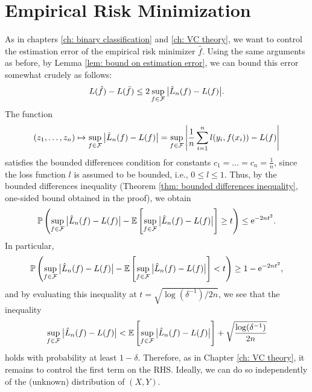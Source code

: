 \section{Empirical Risk Minimization}

As in chapters \ref{ch: binary classification} and \ref{ch: VC theory}, we want to control the estimation error of the empirical risk minimizer $\hat f$. Using the same arguments as before, by Lemma \ref{lem: bound on estimation error}, we can bound this error somewhat crudely as follows:
\[
    L(\hat f) - L(\bar f) \leq 2 \sup_{f \in \mathcal{F}} \big\lvert\hat L_n(f) - L(f)\big\rvert.
\]
The function
\[
    (z_1, \dots, z_n) \mapsto \sup_{f \in \mathcal{F}} \big\lvert\hat L_n(f) - L(f)\big\rvert = \sup_{f \in \mathcal{F}} \abs{ \frac{1}{n} \sum_{i=1}^n l(y_i, f(x_i)) - L(f) }
\]
satisfies the bounded differences condition for constants $c_1 = \dots = c_n = \frac{1}{n}$, since the loss function $l$ is assumed to be bounded, i.e., $0 \leq l \leq 1$. Thus, by the bounded differences inequality (Theorem \ref{thm: bounded differences inequality}, one-sided bound obtained in the proof), we obtain
\[
    \mathbb{P}\left( \sup_{f \in \mathcal{F}} \big\lvert\hat L_n(f) - L(f)\big\rvert - \mathbb{E}\left[ \sup_{f \in \mathcal{F}} \big\lvert\hat L_n(f) - L(f)\big\rvert \right] \geq t \right) \leq \mathrm{e}^{-2nt^2}.
\]
In particular,
\[
    \mathbb{P}\left( \sup_{f \in \mathcal{F}} \big\lvert\hat L_n(f) - L(f)\big\rvert - \mathbb{E}\left[ \sup_{f \in \mathcal{F}} \big\lvert\hat L_n(f) - L(f)\big\rvert \right] < t \right) \geq 1 - \mathrm{e}^{-2nt^2},
\]
and by evaluating this inequality at $t = \sqrt{\log(\delta^{-1})/2n}$, we see that the inequality
\[
    \sup_{f \in \mathcal{F}} \big\lvert\hat L_n(f) - L(f)\big\rvert < \mathbb{E}\left[ \sup_{f \in \mathcal{F}} \big\lvert\hat L_n(f) - L(f)\big\rvert \right] + \sqrt{ \frac{\log(\delta^{-1})}{2n} }
\]
holds with probability at least $1 - \delta$. Therefore, as in Chapter \ref{ch: VC theory}, it remains to control the first term on the RHS. Ideally, we can do so independently of the (unknown) distribution of $(X, Y)$.
